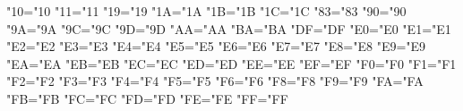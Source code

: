 \lccode"10="10 %
\lccode"11="11 %
\lccode"19="19 %
\lccode"1A="1A %
\lccode"1B="1B %
\lccode"1C="1C %
\lccode"83="83 %
\lccode"90="90 %
\lccode"9A="9A %
\lccode"9C="9C %
\lccode"9D="9D %
\lccode"AA="AA %
\lccode"BA="BA %
\lccode"DF="DF %
\lccode"E0="E0 %
\lccode"E1="E1 %
\lccode"E2="E2 %
\lccode"E3="E3 %
\lccode"E4="E4 %
\lccode"E5="E5 %
\lccode"E6="E6 %
\lccode"E7="E7 %
\lccode"E8="E8 %
\lccode"E9="E9 %
\lccode"EA="EA %
\lccode"EB="EB %
\lccode"EC="EC %
\lccode"ED="ED %
\lccode"EE="EE %
\lccode"EF="EF %
\lccode"F0="F0 %
\lccode"F1="F1 %
\lccode"F2="F2 %
\lccode"F3="F3 %
\lccode"F4="F4 %
\lccode"F5="F5 %
\lccode"F6="F6 %
\lccode"F8="F8 %
\lccode"F9="F9 %
\lccode"FA="FA %
\lccode"FB="FB %
\lccode"FC="FC %
\lccode"FD="FD %
\lccode"FE="FE %
\lccode"FF="FF %

